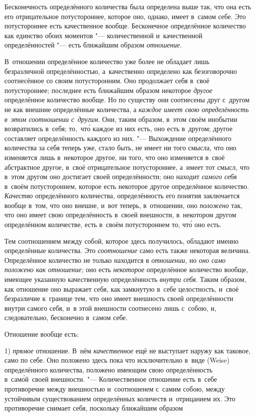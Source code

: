 Бесконечность определённого количества была определена выше так, что она
есть его отрицательное потустороннее, которое оно, однако, имеет в~самом
себе. Это потустороннее есть качественное вообще. Бесконечное определённое
количество как единство обоих моментов "--- количественной и~качественной
определённостей "--- есть ближайшим образом {\em отношение}.

В~отношении определённое количество уже более не обладает лишь безразличной
определённостью, а~качественно определено как безоговорочно соотнесённое со
своим потусторонним. Оно продолжает себя в~своё потустороннее; последнее есть
ближайшим образом некоторое {\em другое} определённое количество вообще. Но по
существу они соотнесены друг с~другом не как внешние определённые количества, а
{\em каждое имеет свою определённость в~этом соотношении с~другим}. Они, таким
образом, в~этом своём инобытии возвратились в~себя; то,~чт\'{о} каждое из них
есть, оно есть в~другом; другое составляет определённость каждого из них. "---
Выхождение определённого количества за себя теперь уже, стало быть, не имеет ни
того смысла, что оно изменяется лишь в~некоторое другое, ни того, что оно
изменяется в~своё абстрактное другое, в~своё отрицательное потустороннее,
а~имеет тот смысл, что в~этом другом оно достигает своей определённости; оно
находит {\em самого себя} в~своём потустороннем, которое есть некоторое другое
определённое количество. {\em Качество} определённого количества,
определённость его понятия заключается вообще в~том, что оно внешне, и~вот
теперь, в~отношении, оно {\em положено} так, что оно имеет свою определённость
в~своей внешности, в~некотором другом определённом количестве, есть в~своём
потустороннем то, чт\'{о} оно есть.

Тем соотношением между собой, которое здесь получилось, обладают именно
определённые количества. Это {\em соотношение} само есть также некоторая
величина. Определённое количество не только находится в {\em отношении,} но
{\em оно само положено как отношение;} оно есть {\em некоторое} определённое
количество вообще, имеющее указанную качественную определённость
{\em внутри себя}. Таким образом, как отношение оно выражает себя, как
замкнутую в~себе целостность, и~своё безразличие к~границе тем, что оно имеет
внешность своей определённости внутри самого себя, и~в этой внешности
соотнесено лишь с~собою, и, следовательно, бесконечно в~самом себе.

Отношение вообще есть:

1) {\em прямое} отношение. В~нём {\em качественное} ещё не выступает наружу как
таковое, само по себе. Оно положено здесь пока что
исключительно в~виде (Weise) определённого количества, положено имеющим свою
определённость в~сам\'{о}й~своей внешности. "--- Количественное отношение есть
в~себе противоречие между внешностью и~соотношенем с~самим собою, между устойчивым существованием
определённых количеств и~отрицанием их. Это противоречие снимает себя, поскольку
ближайшим образом

